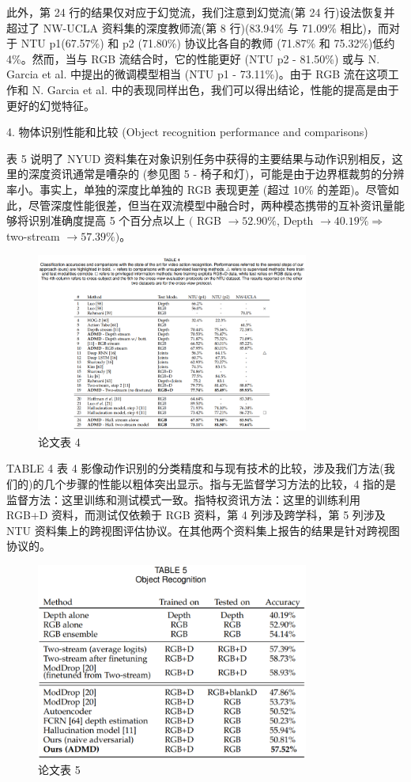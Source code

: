 此外，第 24 行的结果仅对应于幻觉流，我们注意到幻觉流(第 24 行)设法恢复并超过了 NW-UCLA 资料集的深度教师流(第 8 行)(83.94\% 与 71.09\% 相比)，而对于 NTU p1(67.57\%) 和 p2 (71.80\%) 协议比各自的教师 (71.87\% 和 75.32\%)低约 4\%。然而，当与 RGB 流结合时，它的性能更好 (NTU p2 - 81.50\%) 或与 N. Garcia et al. 中提出的微调模型相当 (NTU p1 - 73.11\%)。由于 RGB 流在这项工作和 N. Garcia et al. 中的表现同样出色，我们可以得出结论，性能的提高是由于更好的幻觉特征。

4. 物体识别性能和比较 (Object recognition performance and comparisons) 

表 5 说明了 NYUD 资料集在对象识别任务中获得的主要结果与动作识别相反，这里的深度资讯通常是嘈杂的 (参见图 5 - 椅子和灯)，可能是由于边界框裁剪的分辨率小。事实上，单独的深度比单独的 RGB 表现更差 (超过 10\% 的差距)。尽管如此，尽管深度性能很差，但当在双流模型中融合时，两种模态携带的互补资讯量能够将识别准确度提高 5 个百分点以上 $($ RGB $\rightarrow 52.90 \%$, Depth $\rightarrow 40.19 \% \Rightarrow$ two-stream $\rightarrow 57.39 \%)$。

\begin{figure}[htb]
\centering 
\includegraphics[width=0.80\textwidth]{img/c1m8.png} 
\caption{论文表 4}
\label{Test}
\end{figure}

TABLE 4 表 4
影像动作识别的分类精度和与现有技术的比较，涉及我们方法(我们的)的几个步骤的性能以粗体突出显示。指与无监督学习方法的比较，4 指的是监督方法：这里训练和测试模式一致。指特权资讯方法：这里的训练利用 RGB+D 资料，而测试仅依赖于 RGB 资料，第 4 列涉及跨学科，第 5 列涉及 NTU 资料集上的跨视图评估协议。在其他两个资料集上报告的结果是针对跨视图协议的。

\begin{figure}[htb]
\centering 
\includegraphics[width=0.80\textwidth]{img/c1m9.png} 
\caption{论文表 5}
\label{Test}
\end{figure}

